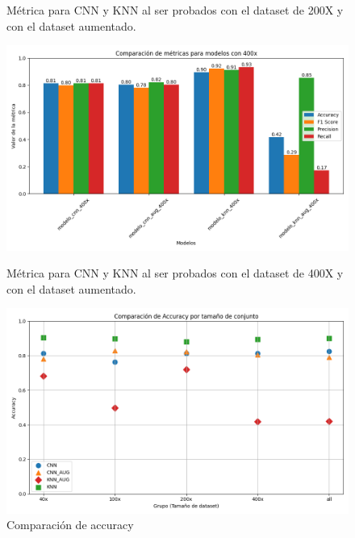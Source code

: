 \documentclass[12pt]{article} %
\begin{document}
\begin{figure}[!ht]
\begin{minipage}[b]{0.45\textwidth}
        \caption{Métrica para CNN y KNN al ser probados con el dataset de 200X y con el dataset aumentado.}
        \label{fig:figura4}
    \end{minipage}
    \hfill
    \begin{minipage}[b]{0.45\textwidth}
        \centering
        \includegraphics[width=\textwidth]{comparison_400x.png}
        \caption{Métrica para CNN y KNN al ser probados con el dataset de 400X y con el dataset aumentado.}
        \label{fig:figura5}
    \end{minipage}
    \hfill
    \begin{minipage}[b]{0.45\textwidth}
        \centering
        \includegraphics[width=\textwidth]{accuracy_comparativa_puntos.png}
        \caption{Comparación de accuracy}
        \label{fig:figura6}
    \end{minipage}
    \hfill
    \begin{minipage}[b]{0.45\textwidth}
        \centering

\end{minipage}
\end{figure}
\end{document}
